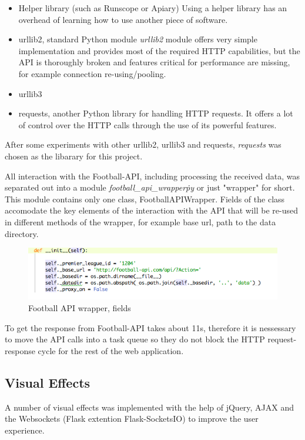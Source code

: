 \begin{itemize}
	\item Helper library (such as Runscope or Apiary)
	Using a helper library has an overhead of learning how to use another piece of software.
	\item urllib2, standard Python module
	\emph{urllib2} module offers very simple implementation and provides most of the required HTTP capabilities, but the API is thoroughly broken and features critical for performance are missing, for example connection re-using/pooling. 
	\item urllib3
	\item requests, another Python library for handling HTTP requests. It offers a lot of control over the HTTP calls through the use of its powerful features.
\end{itemize}
		
After some experiments with other urllib2, urllib3 and requests, \emph{requests} was chosen as the libarary for this project.
		
All interaction with the Football-API, including processing the received data, was separated out into a module \emph{football\_api\_wrapper\.py} or just "wrapper" for short. This module contains only one class, FootballAPIWrapper. Fields of the class accomodate the key elements of the interaction with the API that will be re-used in different methods of the wrapper, for example base url, path to the data directory.
	
\begin{figure}[H]
	\begin{center}
		\includegraphics[width=.90\linewidth,natwidth=610,natheight=642]{impl/images/footballApiWrapperFields}
		\caption{Football API wrapper, fields} \label{fig:using:footballapiwrapperfields}
	\end{center}
\end{figure}
	
To get the response from Football-API takes about 11s, therefore it is nessessary to move the API calls into a task queue so they do not block the HTTP request-response cycle for the rest of the web application.

\subsection{Visual Effects}
A number of visual effects was implemented with the help of jQuery, AJAX and the Websockets (Flask extention Flask-SocketsIO) to improve the user experience. 

